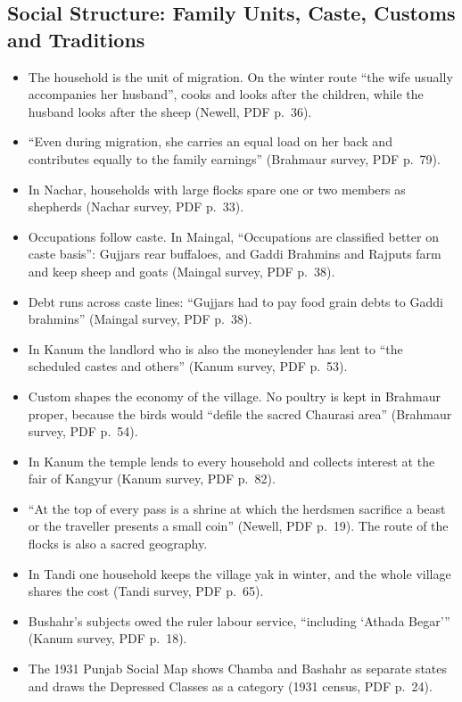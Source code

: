 \documentclass[11pt,a4paper]{article}
\newcommand{\cit}[1]{{\small(#1)}}
\begin{document}
\subsection{Social Structure: Family Units, Caste, Customs and Traditions}
\begin{itemize}
\item The household is the unit of migration. On the winter route \enquote{the
  wife usually accompanies her husband}, cooks and looks after the children,
  while the husband looks after the sheep \cit{Newell, PDF p.~36}.
\item \enquote{Even during migration, she carries an equal load on her back and
  contributes equally to the family earnings} \cit{Brahmaur survey, PDF
  p.~79}.
\item In Nachar, households with large flocks spare one or two members as
  shepherds \cit{Nachar survey, PDF p.~33}.
\item Occupations follow caste. In Maingal, \enquote{Occupations are classified
  better on caste basis}: Gujjars rear buffaloes, and Gaddi Brahmins and
  Rajputs farm and keep sheep and goats \cit{Maingal survey, PDF p.~38}.
\item Debt runs across caste lines: \enquote{Gujjars had to pay food grain debts
  to Gaddi brahmins} \cit{Maingal survey, PDF p.~38}.
\item In Kanum the landlord who is also the moneylender has lent to
  \enquote{the scheduled castes and others} \cit{Kanum survey, PDF p.~53}.
\item Custom shapes the economy of the village. No poultry is kept in Brahmaur
  proper, because the birds would \enquote{defile the sacred Chaurasi area}
  \cit{Brahmaur survey, PDF p.~54}.
\item In Kanum the temple lends to every household and collects interest at the
  fair of Kangyur \cit{Kanum survey, PDF p.~82}.
\item \enquote{At the top of every pass is a shrine at which the herdsmen
  sacrifice a beast or the traveller presents a small coin} \cit{Newell, PDF
  p.~19}. The route of the flocks is also a sacred geography.
\item In Tandi one household keeps the village yak in winter, and the whole
  village shares the cost \cit{Tandi survey, PDF p.~65}.
\item Bushahr's subjects owed the ruler labour service, \enquote{including
  `Athada Begar'} \cit{Kanum survey, PDF p.~18}.
\item The 1931 Punjab Social Map shows Chamba and Bashahr as separate states
  and draws the Depressed Classes as a category \cit{1931 census, PDF p.~24}.
\end{itemize}
\end{document}
